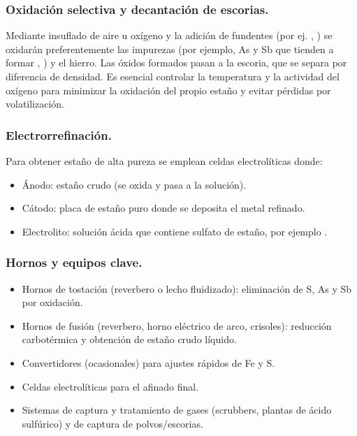 \documentclass[12pt,a4paper]{article}
\begin{document}
\subsubsection{Oxidación selectiva y decantación de escorias.}

Mediante insuflado de aire u oxígeno y la adición de fundentes (por ej. , ) se oxidarán preferentemente las impurezas (por ejemplo, As y Sb que tienden a formar , ) y el hierro. Las óxidos formados pasan a la escoria, que se separa por diferencia de densidad. Es esencial controlar la temperatura y la actividad del oxígeno para minimizar la oxidación del propio estaño y evitar pérdidas por volatilización.

\subsubsection{Electrorrefinación.}

Para obtener estaño de alta pureza se emplean celdas electrolíticas donde:
\begin{itemize}
  \item Ánodo: estaño crudo (se oxida y pasa a la solución).
  \item Cátodo: placa de estaño puro donde se deposita el metal refinado.
  \item Electrolito: solución ácida que contiene sulfato de estaño, por ejemplo .
\end{itemize}

\subsubsection{Hornos y equipos clave.}
\begin{itemize}
  \item Hornos de tostación (reverbero o lecho fluidizado): eliminación de S, As y Sb por oxidación.
  \item Hornos de fusión (reverbero, horno eléctrico de arco, crisoles): reducción carbotérmica y obtención de estaño crudo líquido.
  \item Convertidores (ocasionales) para ajustes rápidos de Fe y S.
  \item Celdas electrolíticas para el afinado final.
  \item Sistemas de captura y tratamiento de gases (scrubbers, plantas de ácido sulfúrico) y de captura de polvos/escorias.
\end{itemize}
\end{document}
